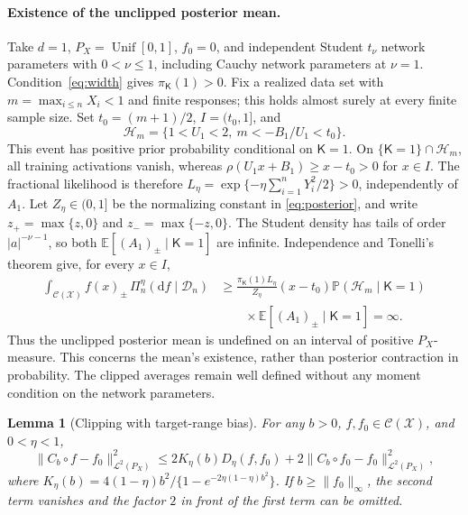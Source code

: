 \documentclass[11pt,a4paper]{article}
\newtheorem{lemma}{Lemma}
\theoremstyle{remark}
\newcommand{\Xcal}{\mathcal X}
\newcommand{\Dcal}{\mathcal D}
\newcommand{\Lcal}{\mathcal L}
\newcommand{\Ccal}{\mathcal C}
\newcommand{\PP}{\mathbb P}
\newcommand{\E}{\mathbb E}
\newcommand{\norm}[1]{\lVert#1\rVert}
\DeclareMathOperator{\Unif}{Unif}
\begin{document}
\paragraph{Existence of the unclipped posterior mean.}
\label{app:unclipped-mean}
Take $d=1$, $P_X=\Unif[0,1]$, $f_0=0$, and independent
Student $t_\nu$ network parameters with $0<\nu\leq1$, including
Cauchy network parameters at $\nu=1$. Condition~\eqref{eq:width} gives
$\pi_{\mathsf K}(1)>0$. Fix a realized data set with
$m=\max_{i\leq n}X_i<1$ and finite responses; this holds almost
surely at every finite sample size. Set
$t_0=(m+1)/2$, $I=(t_0,1]$, and
\[
\mathcal H_m=\{1<U_1<2,\ m<-B_1/U_1<t_0\}.
\]
This event has positive prior probability conditional on
$\mathsf K=1$. On $\{\mathsf K=1\}\cap\mathcal H_m$,
all training activations vanish, whereas
$\rho(U_1x+B_1)\geq x-t_0>0$ for $x\in I$.
The fractional likelihood is therefore
$L_\eta=\exp\{-\eta\sum_{i=1}^nY_i^2/2\}>0$, independently of $A_1$.
Let $Z_\eta\in(0,1]$ be the normalizing constant in
\eqref{eq:posterior}, and write $z_+=\max\{z,0\}$ and
$z_-=\max\{-z,0\}$. The Student density has tails of order
$|a|^{-\nu-1}$, so both
$\E[(A_1)_\pm\mid\mathsf K=1]$ are infinite. Independence and
Tonelli's theorem give, for every $x\in I$,
\begin{align*}
\int_{\Ccal(\Xcal)} f(x)_\pm\,\Pi_n^\eta(\mathrm d f\mid\Dcal_n)
&\geq \frac{\pi_{\mathsf K}(1)L_\eta}{Z_\eta}
(x-t_0)\PP(\mathcal H_m\mid\mathsf K=1)\\
&\qquad{}\times\E[(A_1)_\pm\mid\mathsf K=1]=\infty.
\end{align*}
Thus the unclipped posterior mean is undefined on an interval of
positive $P_X$-measure. This concerns the mean's existence, rather
than posterior contraction in probability. The clipped averages
remain well defined without any moment condition on the network parameters.

\begin{lemma}[Clipping with target-range bias]\label{lem:clipping}
For any $b>0$, $f,f_0\in\Ccal(\Xcal)$, and $0<\eta<1$,
\begin{equation}\label{eq:adaptive-clipping-lemma}
\norm{C_b\circ f-f_0}_{\Lcal^2(P_X)}^2
\leq 2K_\eta(b)D_\eta(f,f_0)
+2\norm{C_b\circ f_0-f_0}_{\Lcal^2(P_X)}^2,
\end{equation}
where $K_\eta(b)=4(1-\eta)b^2/
\{1-e^{-2\eta(1-\eta)b^2}\}$.
If $b\geq\norm{f_0}_\infty$, the second term vanishes and the
factor $2$ in front of the first term can be omitted.
\end{lemma}
\end{document}
